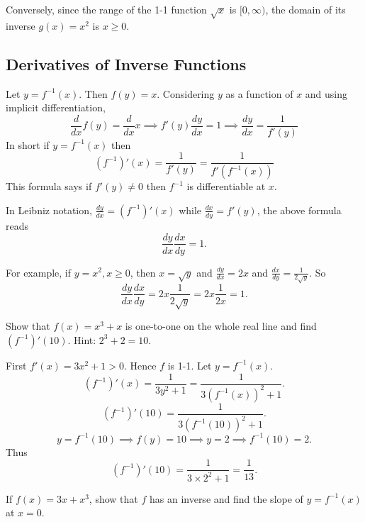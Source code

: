 \documentclass[../main.tex]{subfiles}
\begin{document}
Conversely, since the range of the 1-1 function $\sqrt{x}$ is $[0, \infty)$, the domain of its inverse $g(x) = x^2$ is $x\ge0$.
\subsection*{Derivatives of Inverse Functions}

Let $y = f^{-1}(x)$. Then $f(y)=x$. Considering $y$ as a function of $x$ and using implicit differentiation,
\[
  \frac{d}{dx} f(y) = \frac{d}{dx} x \implies f'(y) \frac{dy}{dx} = 1 \implies \frac{dy}{dx} = \frac{1}{f'(y)}
\]
In short if $y=f^{-1}(x)$ then
\[
  (f^{-1})'(x) = \frac{1}{f'(y)} = \frac{1}{f'(f^{-1}(x))}
\]
This formula says if $f'(y) \neq 0$ then $f^{-1}$ is differentiable at $x$.

\begin{figure}[H]
  \centering
  
\end{figure}


In Leibniz notation, $\frac{dy}{dx} = (f^{-1})'(x)$ while $\frac{dx}{dy} = f'(y)$, the above formula reads
\[
  \frac{dy}{dx} \frac{dx}{dy} = 1.
\]

For example, if $y=x^2, x\ge 0$, then $x=\sqrt{y}$ and $\frac{dy}{dx} = 2x$ and $\frac{dx}{dy} = \frac{1}{2\sqrt{y}}$. So
\[
  \frac{dy}{dx} \frac{dx}{dy} = 2x \frac{1}{2\sqrt{y}} = 2x \frac{1}{2x} = 1.
\]
\begin{example}
  Show that $f(x) = x^3 + x$ is one-to-one on the whole real line and find $(f^{-1})'(10)$. Hint: $2^3 + 2 = 10$.
\end{example}
\begin{solution}
  First $f'(x) = 3x^2 + 1 >0$. Hence $f$ is 1-1.
  Let $y = f^{-1}(x)$.
  \[
    (f^{-1})'(x) = \frac{1}{3 y^2 + 1} = \frac{1}{3 (f^{-1}(x))^2 + 1}.
  \]
  \[
    (f^{-1})'(10) = \frac{1}{3 (f^{-1}(10))^2 + 1}.
  \]
  \[
    y = f^{-1}(10) \implies f(y) = 10 \implies y = 2 \implies f^{-1}(10) = 2.
  \]
  Thus
  \[
    (f^{-1})'(10) = \frac{1}{3\times2^2 + 1} = \frac{1}{13}.
  \]
\end{solution}

\begin{example}
  If $f(x) = 3x + x^3$, show that $f$ has an inverse and find the slope of $y=f^{-1}(x)$ at $x=0$.
\end{example}
\end{document}
